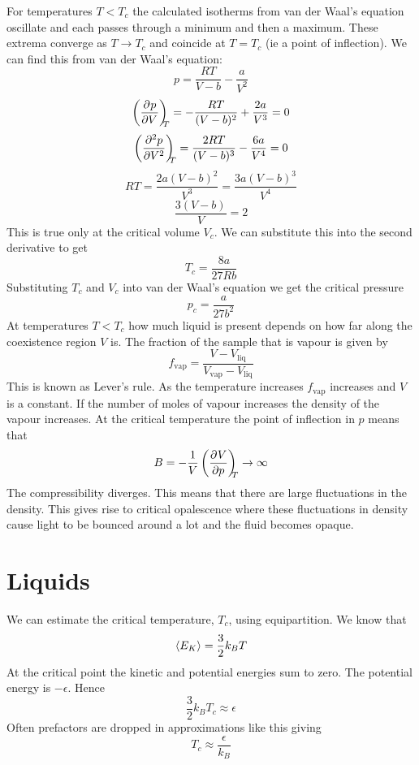 \documentclass{article}
\begin{document}
    For temperatures \(T < T_c\) the calculated isotherms from van der Waal's equation oscillate and each passes through a minimum and then a maximum.
    These extrema converge as \(T\to T_c\) and coincide at \(T = T_c\) (ie a point of inflection).
    We can find this from van der Waal's equation:
    \[p = \frac{RT}{V - b} - \frac{a}{V^2}\]
    \[\left(\pdv[]{p}{V}\right)_{\!\!\!{T}} = -\frac{RT}{(V - b)^2} + \frac{2a}{V^3} = 0\]
    \[\left(\pdv[2]{p}{V}\right)_{\!\!\!{T}} = \frac{2RT}{(V - b)^3} - \frac{6a}{V^4} = 0\]
    \[RT = \frac{2a(V - b)^2}{V^3} = \frac{3a(V - b)^3}{V^4}\]
    \[\frac{3(V- b)}{V} = 2\]
    This is true only at the critical volume \(V_c\).
    We can substitute this into the second derivative to get
    \[T_c = \frac{8a}{27Rb}\]
    Substituting \(T_c\) and \(V_c\) into van der Waal's equation we get the critical pressure
    \[p_c = \frac{a}{27b^2}\]
    At temperatures \(T < T_c\) how much liquid is present depends on how far along the coexistence region \(V\) is.
    The fraction of the sample that is vapour is given by
    \[f_\text{vap} = \frac{V - V_\text{liq}}{V_\text{vap} - V_\text{liq}}\]
    This is known as Lever's rule.
    As the temperature increases \(f_\text{vap}\) increases and \(V\) is a constant.
    If the number of moles of vapour increases the density of the vapour increases.
    At the critical temperature the point of inflection in \(p\) means that
    \[B = -\frac{1}{V}\left(\pdv[]{V}{p}\right)_{\!\!\!{T}}\to\infty\]
    The compressibility diverges.
    This means that there are large fluctuations in the density.
    This gives rise to critical opalescence where these fluctuations in density cause light to be bounced around a lot and the fluid becomes opaque.
    
    \section{Liquids}
    We can estimate the critical temperature, \(T_c\), using equipartition.
    We know that
    \[\left\langle{E_K}\right\rangle = \frac{3}{2}k_BT\]
    At the critical point the kinetic and potential energies sum to zero.
    The potential energy is \(-\epsilon\).
    Hence
    \[\frac{3}{2}k_BT_c \approx \epsilon\]
    Often prefactors are dropped in approximations like this giving
    \[T_c \approx \frac{\epsilon}{k_B}\]
    
\end{document}
